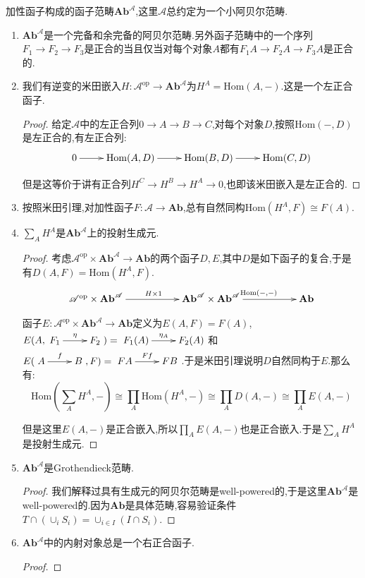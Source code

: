 加性函子构成的函子范畴$\textbf{Ab}^{\mathscr{A}}$,这里$\mathscr{A}$总约定为一个小阿贝尔范畴.
\begin{enumerate}
	\item $\textbf{Ab}^{\mathscr{A}}$是一个完备和余完备的阿贝尔范畴.另外函子范畴中的一个序列$F_1\to F_2\to F_3$是正合的当且仅当对每个对象$A$都有$F_1A\to F_2A\to F_3A$是正合的.
	\item 我们有逆变的米田嵌入$H:\mathscr{A}^{\mathrm{op}}\to\textbf{Ab}^{\mathscr{A}}$为$H^A=\mathrm{Hom}(A,-)$.这是一个左正合函子.
	\begin{proof}
		
		给定$\mathscr{A}$中的左正合列$0\to A\to B\to C$,对每个对象$D$,按照$\mathrm{Hom}(-,D)$是左正合的,有左正合列:$$\xymatrix{0\ar[r]&\mathrm{Hom}(A,D)\ar[r]&\mathrm{Hom}(B,D)\ar[r]&\mathrm{Hom}(C,D)}$$
		
		但是这等价于讲有正合列$H^C\to H^B\to H^A\to0$,也即该米田嵌入是左正合的.
	\end{proof}
	\item 按照米田引理,对加性函子$F:\mathscr{A}\to\textbf{Ab}$,总有自然同构$\mathrm{Hom}(H^A,F)\cong F(A)$.
	\item $\sum_AH^A$是$\textbf{Ab}^{\mathscr{A}}$上的投射生成元.
	\begin{proof}
		
		考虑$\mathscr{A}^{\mathrm{op}}\times\textbf{Ab}^{\mathscr{A}}\to\textbf{Ab}$的两个函子$D,E$,其中$D$是如下函子的复合,于是有$D(A,F)=\mathrm{Hom}(H^A,F)$.
		$$\xymatrix{\mathscr{A}^{\mathrm{op}}\times\textbf{Ab}^{\mathscr{A}}\ar[rr]^{H\times1}&&\textbf{Ab}^{\mathscr{A}}\times\textbf{Ab}^{\mathscr{A}}\ar[rr]^{\mathrm{Hom}(-,-)}&&\textbf{Ab}}$$
		
		函子$E:\mathscr{A}^{\mathrm{op}}\times\textbf{Ab}^{\mathscr{A}}\to\textbf{Ab}$定义为$E(A,F)=F(A)$,$E(A,\xymatrix{F_1\ar[r]^{\eta}&F_2})=\xymatrix{F_1(A)\ar[r]^{\eta_A}&F_2(A)}$和$E(\xymatrix{A\ar[r]^f&B},F)=\xymatrix{FA\ar[r]^{Ff}&FB}$.于是米田引理说明$D$自然同构于$E$.那么有:
		$$\mathrm{Hom}(\sum_AH^A,-)\cong\prod_A\mathrm{Hom}(H^A,-)\cong\prod_AD(A,-)\cong\prod_AE(A,-)$$
		
		但是这里$E(A,-)$是正合嵌入,所以$\prod_AE(A,-)$也是正合嵌入.于是$\sum_AH^A$是投射生成元.
	\end{proof}
	\item $\textbf{Ab}^{\mathscr{A}}$是Grothendieck范畴.
	\begin{proof}
		
		我们解释过具有生成元的阿贝尔范畴是well-powered的,于是这里$\textbf{Ab}^{\mathscr{A}}$是well-powered的.因为$\textbf{Ab}$是具体范畴,容易验证条件$T\cap\left(\cup_iS_i\right)=\cup_{i\in I}(I\cap S_i)$.
	\end{proof}
    \item $\textbf{Ab}^{\mathscr{A}}$中的内射对象总是一个右正合函子.
    \begin{proof}
    	

\end{proof}
\end{enumerate}
